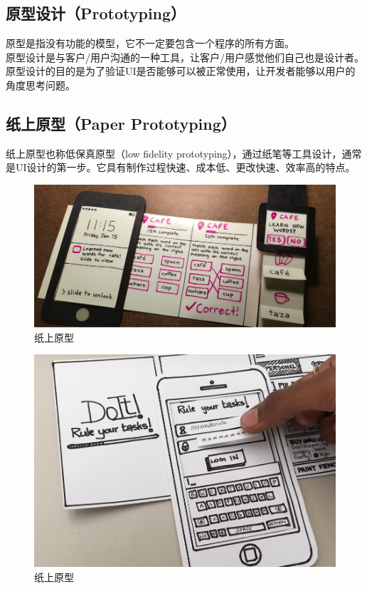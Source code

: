\subsection{原型设计（Prototyping）}

原型是指没有功能的模型，它不一定要包含一个程序的所有方面。\\

原型设计是与客户/用户沟通的一种工具，让客户/用户感觉他们自己也是设计者。原型设计的目的是为了验证UI是否能够可以被正常使用，让开发者能够以用户的角度思考问题。\\

\subsection{纸上原型（Paper Prototyping）}

纸上原型也称低保真原型（low fidelity prototyping），通过纸笔等工具设计，通常是UI设计的第一步。它具有制作过程快速、成本低、更改快速、效率高的特点。\\

\begin{figure}[H]
    \centering
    \includegraphics[scale=0.5]{img/C1/1-3/1.png}
    \caption{纸上原型}
\end{figure}

\begin{figure}[H]
    \centering
    \includegraphics[scale=0.7]{img/C1/1-3/2.png}
    \caption{纸上原型}
\end{figure}

